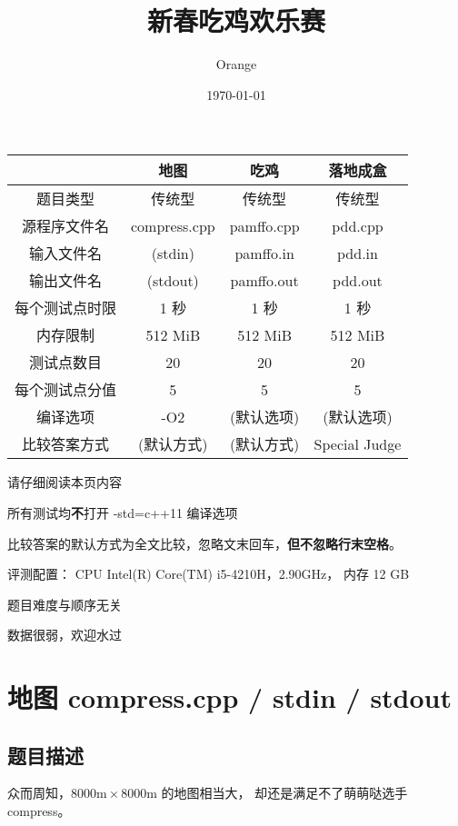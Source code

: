 \documentclass[UTF8]{article}
\title{新春吃鸡欢乐赛}
\author{Orange}
\date{\today}
\begin{document}
	\heiti
	\maketitle

	\begin{center}
		\setlength{\tabcolsep}{7mm}
		{
			\begin{tabular}{cccc}
				\toprule
					& 地图 & 吃鸡 & 落地成盒 \\
					\hline
					题目类型 & 传统型 & 传统型 & 传统型 \\
					源程序文件名 & compress.cpp & pamffo.cpp & pdd.cpp \\
					输入文件名 & (stdin) & pamffo.in & pdd.in \\
					输出文件名 & (stdout) & pamffo.out & pdd.out \\
					每个测试点时限 & 1 秒 & 1 秒 & 1 秒 \\
					内存限制 & 512 MiB & 512 MiB & 512 MiB \\
					测试点数目 & 20 & 20 & 20 \\
					每个测试点分值 & 5 & 5 & 5 \\
					编译选项 & -O2 & (默认选项) & (默认选项) \\
					比较答案方式 & (默认方式) & (默认方式) & Special Judge \\
				\bottomrule
			\end{tabular}
		}
	\end{center}

	\begin{center}
		\begin{Large}
		请仔细阅读本页内容

		所有测试均\textbf{不}打开 -std=c++11 编译选项

		比较答案的默认方式为全文比较，忽略文末回车，\textbf{但不忽略行末空格}。

		\bigskip
		评测配置：		
		CPU Intel(R) Core(TM) i5-4210H，2.90GHz，
		内存 12 GB
	
		\bigskip
		题目难度与顺序无关

		数据很弱，欢迎水过
		\end{Large}
	\end{center}

	\newpage
	\section {地图 \small{compress.cpp / stdin / stdout}}
	\subsection{题目描述}
	众而周知，$8000\mathrm{m} × 8000\mathrm{m}$ 的地图相当大，
	却还是满足不了萌萌哒选手 compress。
\end{document}
